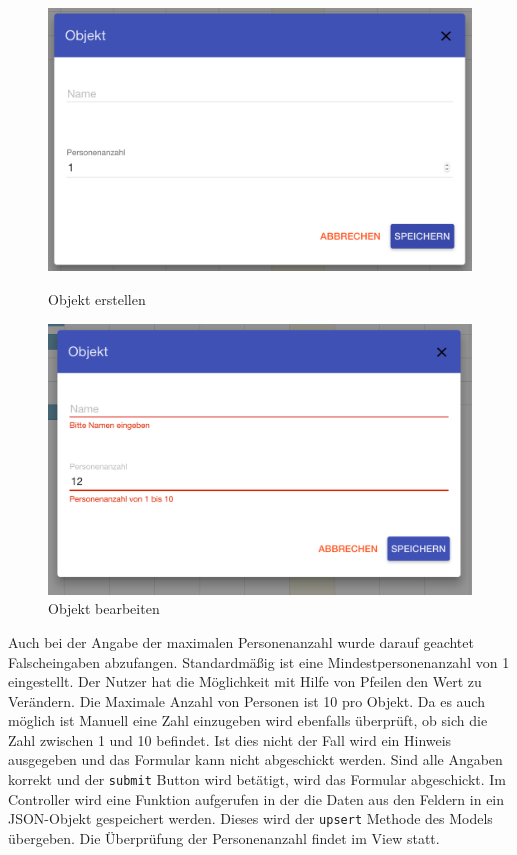 \begin{figure}[H]
    \centering
    \begin{minipage}[t]{0.49\linewidth}
        \centering
        \includegraphics[width=\linewidth]{images/frontend_resource_new.png}
        \caption{Objekt erstellen}
        \label{frontend_resource_new}
    \end{minipage}%
    \hfill
    \begin{minipage}[t]{0.49\linewidth}
        \centering
        \includegraphics[width=\linewidth]{images/frontend_resource_fail.png}
        \caption{Objekt bearbeiten}
		\label{frontend_resource_fail}
    \end{minipage}
\end{figure}


 Auch bei der Angabe der maximalen Personenanzahl wurde darauf geachtet Falscheingaben abzufangen.
 Standardmäßig ist eine Mindestpersonenanzahl von 1 eingestellt. Der Nutzer hat die Möglichkeit mit Hilfe von Pfeilen den Wert zu Verändern.
 Die Maximale Anzahl von Personen ist 10 pro Objekt. Da es auch möglich ist Manuell eine Zahl einzugeben wird ebenfalls überprüft,
 ob sich die Zahl zwischen 1 und 10 befindet. Ist dies nicht der Fall wird ein Hinweis ausgegeben und das Formular kann nicht abgeschickt werden.
 Sind alle Angaben korrekt und der \texttt{submit} Button wird betätigt, wird das Formular abgeschickt. Im Controller wird eine Funktion aufgerufen in
 der die Daten aus den Feldern in ein JSON-Objekt gespeichert werden. Dieses wird der \texttt{upsert} Methode des Models übergeben. Die Überprüfung der
 Personenanzahl findet im View statt.
 
